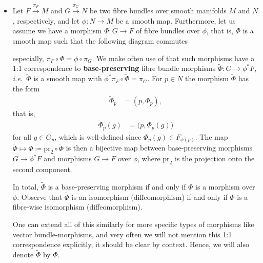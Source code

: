 \documentclass[reqno,a4paper,oneside]{amsart}
\theoremstyle{plain}
\theoremstyle{remark}
\theoremstyle{definition}
\def\ba#1\ea{\begin{align}#1\end{align}}
\def\bas#1\eas{\begin{align*}#1\end{align*}}
\begin{document}
\begin{itemize}
	\item Let $F \stackrel{\pi_F}{\to} M$ and $G \stackrel{\pi_G}{\to} N$ be two fibre bundles over smooth manifolds $M$ and $N$, respectively, and let $\phi\colon N \to M$ be a smooth map. Furthermore, let us assume we have a morphism $\Phi\colon G \to F$ of fibre bundles over $\phi$, that is, $\Phi$ is a smooth map such that the following diagram commutes
	\begin{center}
	\end{center}
especially, $\pi_F \circ \Phi = \phi \circ \pi_G$.
We make often use of that such morphisms have a 1:1 correspondence to \textbf{base-preserving} fibre bundle morphisms $\widetilde{\Phi}\colon G \to \phi^*F$, \textit{i.e.}\ $\widetilde{\Phi}$ is a smooth map with $\phi^*\pi_F \circ \widetilde{\Phi} = \pi_G$. For $p \in N$ the morphism $\widetilde{\Phi}$ has the form
\begin{align*}
\widetilde{\Phi}_p
&=
(p, \Phi_p),
\end{align*}
that is,
\begin{align*}
\widetilde{\Phi}_p(g)
&=
\bigl(p, \Phi_p(g) \bigr)
\end{align*}
for all $g \in G_p$, which is well-defined since $\Phi_p(g) \in F_{\phi(p)}$. The map $\widetilde{\Phi} \mapsto \Phi \coloneqq \mathrm{pr}_2 \circ \widetilde{\Phi}$ is then a bijective map between base-preserving morphisms $G \to \phi^*F$ and morphisms $G \to F$ over $\phi$, where $\mathrm{pr}_2$ is the projection onto the second component. 

In total, $\widetilde{\Phi}$ is a base-preserving morphism if and only if $\Phi$ is a morphism over $\phi$. Observe that $\widetilde{\Phi}$ is an isomorphism (diffeomorphism) if and only if $\Phi$ is a fibre-wise isomorphism (diffeomorphism).

One can extend all of this similarly for more specific types of morphisms like vector bundle-morphisms, and very often we will not mention this 1:1 correspondence explicitly, it should be clear by context. Hence, we will also denote $\widetilde{\Phi}$ by $\Phi$.
%


\end{itemize}
\end{document}
